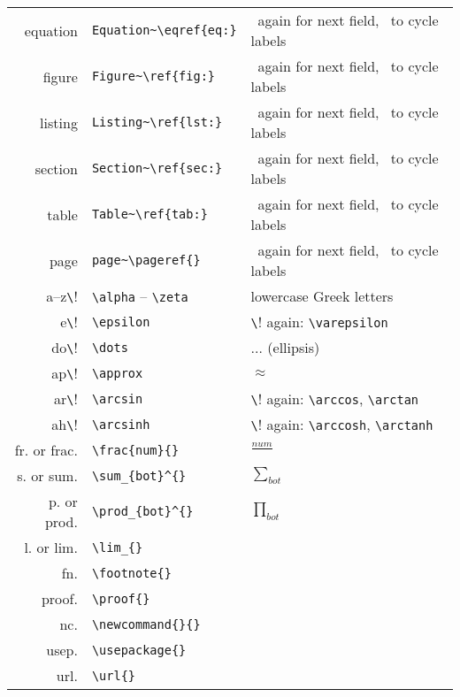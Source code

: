 \documentclass[10pt]{article}
\begin{document}
\begin{table}
\begin{tabular}{r|l|l}
	\hline

	equation\tabkey        & \verb!Equation~\eqref{eq:}!     & \tabkey~again for next field, \esckey~to cycle labels        \\
	figure\tabkey          & \verb!Figure~\ref{fig:}!        & \tabkey~again for next field, \esckey~to cycle labels       \\
	listing\tabkey         & \verb!Listing~\ref{lst:}!       & \tabkey~again for next field, \esckey~to cycle labels       \\
	section\tabkey         & \verb!Section~\ref{sec:}!       & \tabkey~again for next field, \esckey~to cycle labels       \\
	table\tabkey           & \verb!Table~\ref{tab:}!         & \tabkey~again for next field, \esckey~to cycle labels       \\
	page\tabkey            & \verb!page~\pageref{}!          & \tabkey~again for next field, \esckey~to cycle labels       \\

	\hline

	a--z\cmdkey\verb!\!       & \verb!\alpha! -- \verb!\zeta!    & lowercase Greek letters   \\
	e\cmdkey\verb!\!          & \verb!\epsilon!                  & \cmdkey\verb!\! again: \verb!\varepsilon!                     \\
	do\cmdkey\verb!\!         & \verb!\dots!                     & $\dots$ (ellipsis)        \\
	ap\cmdkey\verb!\!         & \verb!\approx!                   & $\approx$                 \\
	ar\cmdkey\verb!\!         & \verb!\arcsin!                   & \cmdkey\verb!\! again: \verb!\arccos!, \verb!\arctan!       \\
	ah\cmdkey\verb!\!         & \verb!\arcsinh!                  & \cmdkey\verb!\! again: \verb!\arccosh!, \verb!\arctanh!     \\
	\hline
	fr\ctlkey\shiftkey. or frac\ctlkey\shiftkey.    & \verb!\frac{num}{}!              & $\frac{num}{}$      \\
	s\ctlkey\shiftkey. or sum\ctlkey\shiftkey.      & \verb!\sum_{bot}^{}!             & $\sum_{bot}^{}$     \\ 
	p\ctlkey\shiftkey. or prod\ctlkey\shiftkey.     & \verb!\prod_{bot}^{}!            & $\prod_{bot}^{}$    \\ 
	l\ctlkey\shiftkey. or lim\ctlkey\shiftkey.      & \verb!\lim_{}!                   &    \\
	fn\ctlkey\shiftkey.                             & \verb!\footnote{}!               &    \\ 
	proof\ctlkey\shiftkey.                          & \verb!\proof{}!                  &    \\
	nc\ctlkey\shiftkey.                             & \verb!\newcommand{}{}!           &    \\
	usep\ctlkey\shiftkey.                           & \verb!\usepackage{}!             &    \\
	url\ctlkey\shiftkey.                            & \verb!\url{}!                    &    \\


\end{tabular}
\end{table}
\end{document}
